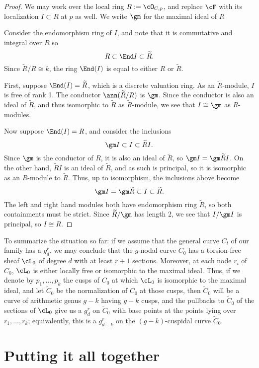 \begin{proof} We may work over the local ring $R := \cO_{C,p}$, and replace $\cF$ with 
its localization $I\subset R$ at $p$ as well. We write
$\gm$ for the maximal ideal of $R$

Consider the endomorphism ring of $I$, and note that it is commutative and integral over $R$ so 
$$
R \subset \End I \subset \widetilde R.
$$
Since
$\widetilde R/R \cong k$, the ring $\End(I)$ is equal to either 
$R$ or $\widetilde R$. 

First, suppose
$\End(I)=\widetilde R$, which is a discrete valuation ring.
 As an 
$\widetilde R$-module, $I$ is free of rank 1.  The conductor
$\ann(\widetilde R/R)$ is $\gm$.
Since the conductor is also an ideal of $\widetilde R$, and thus isomorphic to $\widetilde R$
as $\widetilde R$-module,
we see that $I \cong \gm$ as $R$-modules.

Now suppose
$\End(I)=R$, and consider the inclusions
$$
\gm I \subset I \subset \widetilde R I.
$$
Since $\gm$ is the conductor of $R$, it is also an ideal of $\widetilde R$, so
$\gm I = \gm \widetilde R I$. On the other hand, $\widetilde R I$ is an ideal of $\widetilde R$,
and as such is principal, so it is isomorphic as an $R$-module to $\widetilde R$. Thus, up to 
isomorphism, the inclusions above become
$$
\gm I = \gm \widetilde R \subset I \subset \widetilde R.
$$
The left and right hand modules both have endomorphism ring $\widetilde R$,
so both containments must be strict. Since $\widetilde R/\gm$ has length 2,
we see that $I/\gm I$ is principal, so $I\cong R$.
\end{proof}

To summarize the situation so far: if we assume that the general curve $C_t$ of our family has a $g^r_d$, we may conclude that the $g$-nodal curve $C_0$ has a torsion-free sheaf $\cL_0$ of degree $d$ with at least $r+1$ sections. Moreover, at each node $r_i$ of $C_0$, $\cL_0$ is either locally free or isomorphic to the maximal ideal. Thus, if we denote by $p_1,\dots, p_k$ the cusps of $C_0$ at which $\cL_0$ is isomorphic to the maximal ideal, and let $\tilde C_0$ be the normalization of $C_0$ at those cusps, then $\tilde C_0$ will be a curve of arithmetic genus $g-k$ having $g-k$ cusps, and
the pullbacks to $\tilde C_0$ of the sections of $\cL_0$ give us a $g^r_d$ on $\tilde C_0$ with base points at the points lying over $r_1,\dots,r_k$; equivalently, this is a $g^r_{d-k}$ on the $(g-k)$-cuspidal curve  $\tilde C_0$.



\section{Putting it all together}


